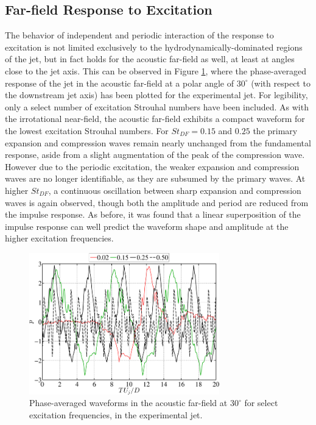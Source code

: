 \documentclass[english]{aiaa-tc}
\begin{document}
\subsection{Far-field Response to Excitation}
The behavior of independent and periodic interaction of the
response to excitation is not limited exclusively to the
hydrodynamically-dominated regions of the jet, but in fact holds for
the acoustic far-field as well, at least at angles close to the jet
axis. This can be observed in Figure \ref{PhavgFF1}, where the
phase-averaged response of the jet in the acoustic far-field at a
polar angle of $30^\circ$ (with respect to the downstream jet axis)
has been plotted for the experimental jet. For legibility, only a
select number of excitation Strouhal numbers have been included. As
with the irrotational near-field, the acoustic far-field exhibits a
compact waveform for the lowest excitation Strouhal numbers. For
$St_{DF}  = 0.15$ and $0.25$ the primary expansion and compression
waves remain nearly unchanged from the fundamental response, aside from
a slight augmentation of the peak of the compression wave. However due
to the periodic excitation, the weaker expansion and compression waves
are no longer identifiable, as they are subsumed by the primary
waves. At higher $St_{DF}$, a continuous oscillation between sharp
expansion and compression waves is again observed, though both the
amplitude and period are reduced from the impulse response. As before,
it was found that a linear superposition of the impulse response can
well predict the waveform shape and amplitude at the higher excitation
frequencies. 
\begin{figure}
\begin{center}
	\includegraphics[width=3.25in]{Phase_average_FF1}
    \caption{Phase-averaged waveforms in the acoustic far-field at $30^\circ$ for select excitation frequencies, in the experimental jet.}\label{PhavgFF1}
\end{center}
\end{figure}
\end{document}
